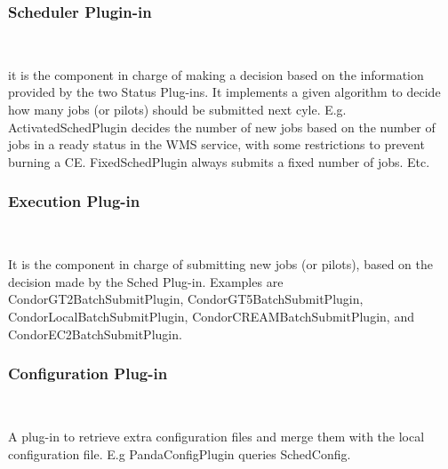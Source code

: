 \documentclass[a4paper]{jpconf}
\begin{document}
\subsubsection{Scheduler Plugin-in}

~

\noindent it is the component in charge of making a decision based on the information provided by the two Status Plug-ins. 
It implements a given algorithm to decide how many jobs (or pilots) should be submitted next cyle. 
E.g. ActivatedSchedPlugin decides the number of new jobs based on the number of jobs in a ready status in the WMS service, 
with some restrictions to prevent burning a CE. 
FixedSchedPlugin always submits a fixed number of jobs. Etc.

\subsubsection{Execution Plug-in}

~

\noindent It is the component in charge of submitting new jobs (or pilots), 
based on the decision made by the Sched Plug-in. 
Examples are CondorGT2BatchSubmitPlugin, CondorGT5BatchSubmitPlugin, CondorLocalBatchSubmitPlugin, CondorCREAMBatchSubmitPlugin, 
and CondorEC2BatchSubmitPlugin.

\subsubsection{Configuration Plug-in}

~

\noindent A plug-in to retrieve extra configuration files and merge them with the local configuration file.
E.g PandaConfigPlugin queries SchedConfig. 

~
\end{document}
